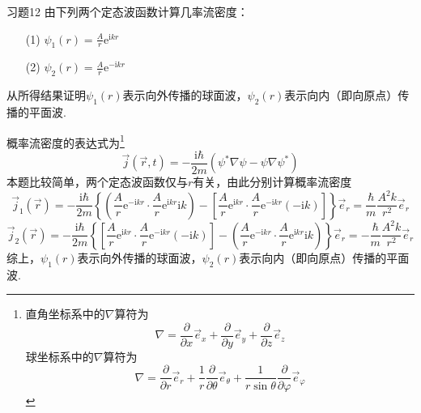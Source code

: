 \begin{question}{习题12}
    由下列两个定态波函数计算几率流密度：
    \begin{enumerate}
        \item[(1)] $\psi_1(r)=\frac{A}{r}\mathrm{e}^{\mathrm{i}kr}$
        \item[(2)] $\psi_2(r)=\frac{A}{r}\mathrm{e}^{-\mathrm{i}kr}$
    \end{enumerate}
    从所得结果证明$\psi_1(r)$表示向外传播的球面波，$\psi_2(r)$表示向内（即向原点）传播的平面波.
\end{question}
\begin{solution}
    概率流密度的表达式为\footnote{
        直角坐标系中的$\nabla$算符为
        $$
            \nabla = \frac{\partial}{\partial x}\vec{e}_x+\frac{\partial}{\partial y}\vec{e}_y+\frac{\partial}{\partial z}\vec{e}_z
        $$
        球坐标系中的$\nabla$算符为$$
            \nabla=\frac{\partial }{\partial r}\vec{e}_r + \frac{1}{r}\frac{\partial }{\partial \theta}\vec{e}_{\theta} + \frac{1}{r\sin\theta}\frac{\partial }{\partial \varphi}\vec{e}_{\varphi}
        $$
    }
    \begin{equation}\label{概率流密度}
        \vec{j}(\vec{r}, t) = -\frac{\mathrm{i}\hbar}{2m}\left(\psi^*\nabla\psi-\psi\nabla\psi^*\right)
    \end{equation}
    本题比较简单，两个定态波函数仅与$r$有关，由此分别计算概率流密度
    $$
        \vec{j}_1(\vec{r}) = -\frac{\mathrm{i}\hbar}{2m}\left\{\left(\frac{A}{r}\mathrm{e}^{-\mathrm{i}kr}\cdot\frac{A}{r}\mathrm{e}^{\mathrm{i}kr}\mathrm{i}k\right) - \left[\frac{A}{r}\mathrm{e}^{\mathrm{i}kr}\cdot\frac{A}{r}\mathrm{e}^{-\mathrm{i}kr}(-\mathrm{i}k)\right]\right\}\vec{e}_r
        =\frac{\hbar}{m}\frac{A^2k}{r^2}\vec{e}_r
    $$
    $$
        \vec{j}_2(\vec{r}) = -\frac{\mathrm{i}\hbar}{2m}\left\{\left[\frac{A}{r}\mathrm{e}^{\mathrm{i}kr}\cdot\frac{A}{r}\mathrm{e}^{-\mathrm{i}kr}(-\mathrm{i}k)\right]-\left(\frac{A}{r}\mathrm{e}^{-\mathrm{i}kr}\cdot\frac{A}{r}\mathrm{e}^{\mathrm{i}kr}\mathrm{i}k\right)\right\}\vec{e}_r
        =-\frac{\hbar}{m}\frac{A^2k}{r^2}\vec{e}_r
    $$
    综上，$\psi_1(r)$表示向外传播的球面波，$\psi_2(r)$表示向内（即向原点）传播的平面波.
\end{solution}
